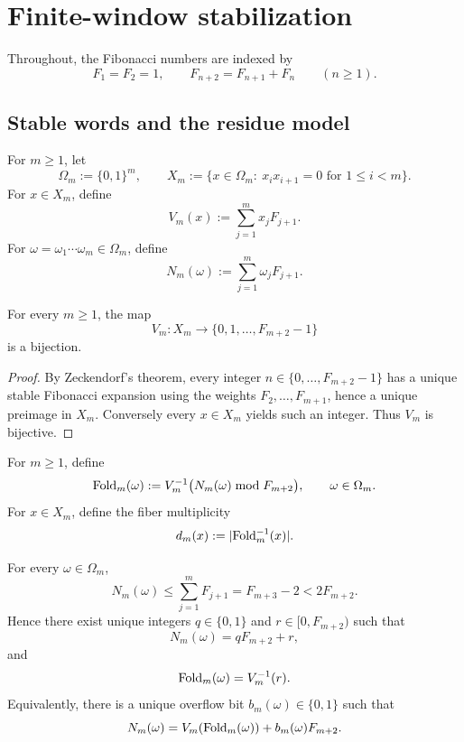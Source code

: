 \section{Finite-window stabilization}\label{sec:preliminaries}

Throughout, the Fibonacci numbers are indexed by
\[
  F_1=F_2=1,
  \qquad
  F_{n+2}=F_{n+1}+F_n
  \qquad (n\ge 1).
\]

\subsection{Stable words and the residue model}

\begin{definition}
\label{def:stable-words}
For \(m\ge 1\), let
\[
  \Omega_m:=\{0,1\}^m,
  \qquad
  X_m:=\{x\in\Omega_m:\ x_ix_{i+1}=0\text{ for }1\le i<m\}.
\]
For \(x\in X_m\), define
\[
  V_m(x):=\sum_{j=1}^m x_jF_{j+1}.
\]
For \(\omega=\omega_1\cdots \omega_m\in\Omega_m\), define
\[
  N_m(\omega):=\sum_{j=1}^m \omega_jF_{j+1}.
\]
\end{definition}

\begin{proposition}
\label{prop:Vm-bijection}
For every \(m\ge 1\), the map
\[
  V_m\colon X_m\longrightarrow \{0,1,\dots,F_{m+2}-1\}
\]
is a bijection.
\end{proposition}

\begin{proof}
By Zeckendorf's theorem, every integer \(n\in\{0,\dots,F_{m+2}-1\}\) has a
unique stable Fibonacci expansion using the weights \(F_2,\dots,F_{m+1}\),
hence a unique preimage in \(X_m\).  Conversely every \(x\in X_m\) yields such
an integer.  Thus \(V_m\) is bijective.
\end{proof}

\begin{definition}
\label{def:fold-map}
For \(m\ge 1\), define
\[
  \mathrm{Fold}_m(\omega):=
  V_m^{-1}\bigl(N_m(\omega)\bmod F_{m+2}\bigr),
  \qquad \omega\in\Omega_m.
\]
For \(x\in X_m\), define the fiber multiplicity
\[
  d_m(x):=\lvert \mathrm{Fold}_m^{-1}(x) \rvert.
\]
\end{definition}

\begin{proposition}
\label{prop:single-overflow}
For every \(\omega\in\Omega_m\),
\[
  N_m(\omega)\le \sum_{j=1}^m F_{j+1}=F_{m+3}-2<2F_{m+2}.
\]
Hence there exist unique integers \(q\in\{0,1\}\) and \(r\in[0,F_{m+2})\) such
that
\[
  N_m(\omega)=qF_{m+2}+r,
\]
and
\[
  \mathrm{Fold}_m(\omega)=V_m^{-1}(r).
\]
Equivalently, there is a unique overflow bit \(b_m(\omega)\in\{0,1\}\) such
that
\[
  N_m(\omega)=V_m(\mathrm{Fold}_m(\omega))+b_m(\omega)F_{m+2}.
\]
\end{proposition}

